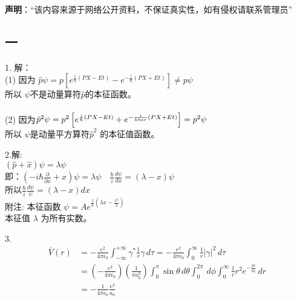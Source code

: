 
\textbf{声明}：“该内容来源于网络公开资料，不保证真实性，如有侵权请联系管理员”


\subsection{一}
1. 解：\\
(1) 因为 $\hat{p} \psi = p\left[e^{\frac{i}{\hbar}(PX - Et)} - e^{-\frac{i}{\hbar}(PX + Et)}\right] \neq p\psi$\\
所以 $\psi$不是动量算符$\hat{p}$的本征函数。\\\\
(2) 因为$\hat{p}^2 \psi = p^2\left[e^{\frac{i}{\hbar}(PX - Et)} + e^{-\frac{i}{\\hbar}(PX + Et)}\right] = p^2\psi$ \\
所以 $\psi$是动量平方算符$\hat{p}^2$ 的本征值函数。 

2.解:\\
$(\hat{p} + \hat{x})\psi = \lambda \psi$\\
即：$(-i\hbar\frac{\partial}{\partial x} + x)\psi = \lambda \psi \quad \frac{\hbar}{i} \frac{d\psi}{dx} = (\lambda - x)\psi$ \\
所以$\frac{\hbar}{i} \frac{d\psi}{\psi} = (\lambda - x)dx$\\
附注: 本征函数 $\psi = Ae^{\frac{1}{\hbar}(\lambda x - \frac{x^2}{2})}$ \\
      本征值 $\lambda$ 为所有实数。

3.\begin{align}
\overline{V}(r) &= -\frac{e^2}{4 \pi \epsilon_0} \int_{-\infty}^{+\infty} \gamma^* \frac{1}{r} \gamma \, d\tau 
= -\frac{e^2}{4 \pi \epsilon_0} \int_0^\infty \frac{1}{r} |\gamma|^2 \, d\tau\\
&= \left( -\frac{e^2}{4 \pi \epsilon_0} \right) \left( \frac{1}{\pi a_0^3} \right) \int_0^\pi \sin \theta \, d\theta \int_0^{2\pi} \, d\phi \int_0^\infty \frac{1}{r} r^2 e^{-\frac{2r}{a_0}} \, dr\\
&= -\frac{1}{4 \pi \epsilon_0} \frac{e^2}{a_0}~
\end{align}
